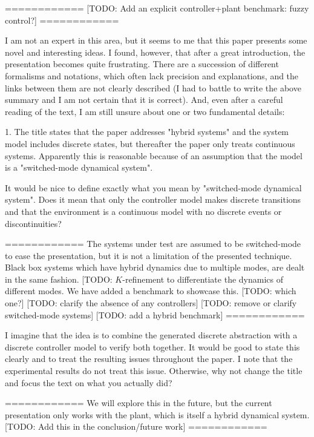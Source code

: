    ============
   [TODO: Add an explicit controller+plant benchmark: fuzzy control?]
   ============

I am not an expert in this area, but it seems to me that this paper presents
some novel and interesting ideas. I found, however, that after a great
introduction, the presentation becomes quite frustrating. There are a
succession of different formalisms and notations, which often lack precision
and explanations, and the links between them are not clearly described (I
had to battle to write the above summary and I am not certain that it is
correct). And, even after a careful reading of the text, I am still unsure
about one or two fundamental details:

1. The title states that the paper addresses "hybrid systems" and the system
   model includes discrete states, but thereafter the paper only treats
   continuous systems. Apparently this is reasonable because of an
   assumption that the model is a "switched-mode dynamical system".

   It would be nice to define exactly what you mean by "switched-mode
   dynamical system". Does it mean that only the controller model makes
   discrete transitions and that the environment is a continuous model with
   no discrete events or discontinuities?

   ============
   The systems under test are assumed to be switched-mode to ease the
   presentation, but it is not a limitation of the presented
   technique. Black box systems which have hybrid dynamics due to
   multiple modes, are dealt in the same fashion.
   [TODO: $K$-refinement to differentiate the dynamics of different modes.
   We have added a benchmark to showcase this.
   [TODO: which one?]
   [TODO: clarify the absence of any controllers]
   [TODO: remove or clarify switched-mode systems]
   [TODO: add a hybrid benchmark]
   ============

   I imagine that the idea is to combine the generated discrete abstraction
   with a discrete controller model to verify both together. It would be
   good to state this clearly and to treat the resulting issues throughout
   the paper. I note that the experimental results do not treat this issue.
   Otherwise, why not change the title and focus the text on what you
   actually did?

   ============
   We will explore this in the future, but the current presentation
   only works with the plant, which is itself a hybrid dynamical
   system.
   [TODO: Add this in the conclusion/future work]
   ============


